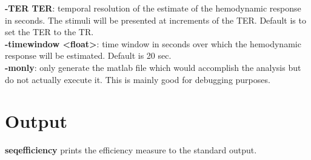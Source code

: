 \documentclass[10pt]{article}
\begin{document}
\noindent
{\bf -TER TER}: temporal resolution of the estimate of the hemodynamic
response in seconds. The stimuli will be presented at increments of
the TER.  Default is to set the TER to the TR.\\

\noindent
{\bf -timewindow <float>}:  time window in seconds over which the
hemodynamic response will be estimated.  Default is 20 sec.\\

\noindent
{\bf -monly}: only generate the matlab file which would accomplish the
analysis but do not actually execute it.  This is mainly good for
debugging purposes.\\

\section{Output}

{\bf seqefficiency} prints the efficiency measure to the standard output.\\
\end{document}
